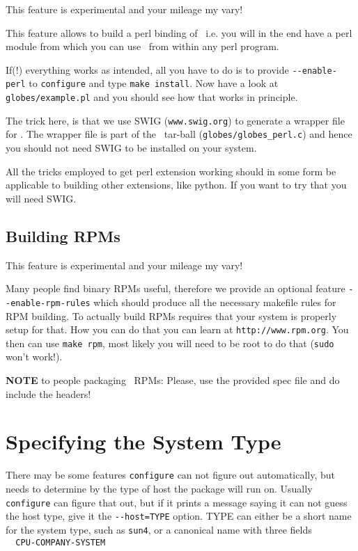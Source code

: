 \begin{appendix}
This feature is experimental and your mileage my vary!

This feature allows to build a perl binding of \GLOBES\, i.e. you will
in the end have a perl module from which you can use \GLOBES\ from within
any perl program.

If(!) everything works as intended, all you have to do is to provide
\verb+--enable-perl+ to \verb+configure+ and type \verb+make install+. Now have a
look at \verb+globes/example.pl+ and you should see how that works in
principle. 

The trick here, is that we use SWIG (\verb+www.swig.org+) to generate
a wrapper file for \GLOBES. The wrapper file is part of the \GLOBES\
tar-ball (\verb+globes/globes_perl.c+) and hence you should not need SWIG to
be installed on your system.

All the tricks employed to get perl extension working should in some
form be applicable to building other extensions, like python. If
you want to try that you will need SWIG.

\subsection*{Building RPMs}


This feature is experimental and your mileage my vary!

Many people find binary RPMs useful, therefore we provide an optional
feature \verb+--enable-rpm-rules+ which should produce all the necessary
makefile rules for RPM building. To actually build RPMs requires that
your system is properly setup for that. How you can do that you can
learn at \verb+http://www.rpm.org+. You then can use \verb+make rpm+, most likely
you will need to be root to do that (\verb+sudo+ won't work!).

{\bf NOTE} to people packaging \GLOBES\ RPMs: Please, use the provided spec
file and do include the headers!

\section*{Specifying the System Type}


   There may be some features \verb+configure+ can not figure out
automatically, but needs to determine by the type of host the package
will run on.  Usually \verb+configure+ can figure that out, but if it prints
a message saying it can not guess the host type, give it the
\verb+--host=TYPE+ option.  TYPE can either be a short name for the system
type, such as \verb+sun4+, or a canonical name with three fields\\
\verb+  CPU-COMPANY-SYSTEM+


\end{appendix}
